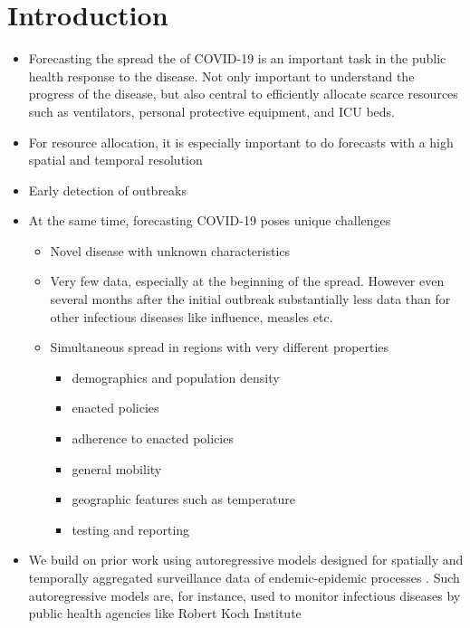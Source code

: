 \documentclass{article}
\begin{document}
\section{Introduction}
\label{sec:org3adcb67}
\begin{itemize}
\item Forecasting the spread the of COVID-19 is an important task in the public
health response to the disease. Not only important to understand the progress
of the disease, but also central to efficiently allocate scarce resources such
as ventilators, personal protective equipment, and ICU beds.
\item For resource allocation, it is especially important to do forecasts with a
high spatial and temporal resolution
\item Early detection of outbreaks
\item At the same time, forecasting COVID-19 poses unique challenges
\begin{itemize}
\item Novel disease with unknown characteristics
\item Very few data, especially at the beginning of the spread. However even
several months after the initial outbreak substantially less data than for other
infectious diseases like influence, measles etc.
\item Simultaneous spread in regions with very different properties
\begin{itemize}
\item demographics and population density
\item enacted policies
\item adherence to enacted policies
\item general mobility
\item geographic features such as temperature
\item testing and reporting
\end{itemize}
\end{itemize}
\item We build on prior work using autoregressive models designed for spatially and
temporally aggregated surveillance data of endemic-epidemic processes
\citep{held2005statistical,meyer2014powerlaw,meyer2016socialcontact}. Such
autoregressive models are, for instance, used to monitor infectious diseases
by public health agencies like Robert Koch Institute \citep{salmon2016surveillance}
\end{itemize}
\end{document}
